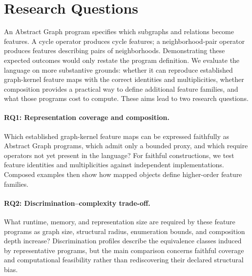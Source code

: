 \section{Research Questions}
\label{sec:research-questions}

An Abstract Graph program specifies which subgraphs and relations become
features. A cycle operator produces cycle features; a neighborhood-pair
operator produces features describing pairs of neighborhoods. Demonstrating
these expected outcomes would only restate the program definition. We evaluate
the language on more substantive grounds: whether it can reproduce established
graph-kernel feature maps with the correct identities and multiplicities,
whether composition provides a practical way to define additional feature
families, and what those programs cost to compute. These aims lead to two
research questions.

\paragraph{RQ1: Representation coverage and composition.}
Which established graph-kernel feature maps can be expressed faithfully as
Abstract Graph programs, which admit only a bounded proxy, and which require
operators not yet present in the language? For faithful constructions, we test
feature identities and multiplicities against independent implementations.
Composed examples then show how mapped objects define higher-order feature
families.

\paragraph{RQ2: Discrimination--complexity trade-off.}
What runtime, memory, and representation size are required by these feature
programs as graph size, structural radius, enumeration bounds, and composition
depth increase? Discrimination profiles describe the equivalence classes
induced by representative programs, but the main comparison concerns faithful
coverage and computational feasibility rather than rediscovering their declared
structural bias.
